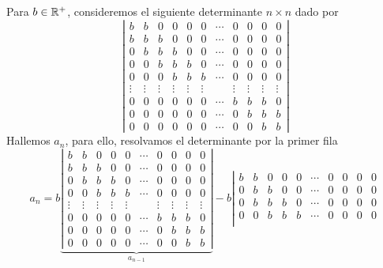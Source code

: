 \begin{myexample}
    Para $b \in \RR[+]$, consideremos el siguiente determinante $n \times n$ dado por
    $$\left| \begin{array}{ccccccccccccc}
        b & b & 0 & 0 & 0 & 0 & \cdots & 0 & 0 & 0 & 0 \\
        b & b & b & 0 & 0 & 0 & \cdots & 0 & 0 & 0 & 0 \\
        0 & b & b & b & 0 & 0 & \cdots & 0 & 0 & 0 & 0 \\
        0 & 0 & b & b & b & 0 & \cdots & 0 & 0 & 0 & 0 \\
        0 & 0 & 0 & b & b & b & \cdots & 0 & 0 & 0 & 0 \\
        \vdots & \vdots & \vdots & \vdots & \vdots & \vdots & & \vdots & \vdots & \vdots & \vdots \\
        0 & 0 & 0 & 0 & 0 & 0 & \cdots & b & b & b & 0 \\
        0 & 0 & 0 & 0 & 0 & 0 & \cdots & 0 & b & b & b \\
        0 & 0 & 0 & 0 & 0 & 0 & \cdots & 0 & 0 & b & b
    \end{array}\right|$$
    Hallemos $a_n$, para ello, resolvamos el determinante por la primer fila
    $$a_n = b \underbrace{\left| \begin{array}{cccccccccccc}
        b & b & 0 & 0 & 0 & \cdots & 0 & 0 & 0 & 0 \\
        b & b & b & 0 & 0 & \cdots & 0 & 0 & 0 & 0 \\
        0 & b & b & b & 0 & \cdots & 0 & 0 & 0 & 0 \\
        0 & 0 & b & b & b & \cdots & 0 & 0 & 0 & 0 \\
        \vdots & \vdots & \vdots & \vdots & \vdots & & \vdots & \vdots & \vdots & \vdots \\
        0 & 0 & 0 & 0 & 0 & \cdots & b & b & b & 0 \\
        0 & 0 & 0 & 0 & 0 & \cdots & 0 & b & b & b \\
        0 & 0 & 0 & 0 & 0 & \cdots & 0 & 0 & b & b
    \end{array}\right|}_{a_{n-1}} - b \left| \begin{array}{cccccccccccc}
        b & b & 0 & 0 & 0 & \cdots & 0 & 0 & 0 & 0 \\
        0 & b & b & 0 & 0 & \cdots & 0 & 0 & 0 & 0 \\
        0 & b & b & b & 0 & \cdots & 0 & 0 & 0 & 0 \\
        0 & 0 & b & b & b & \cdots & 0 & 0 & 0 & 0 \\

\end{array}$$
\end{myexample}

